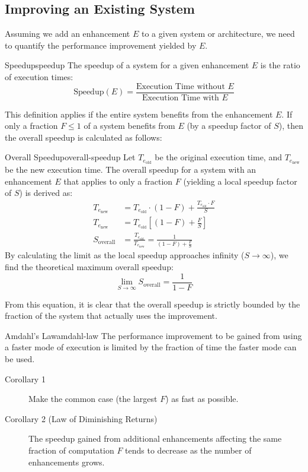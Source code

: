 \subsection{Improving an Existing System}

Assuming we add an enhancement \(E\) to a given system or architecture, we need to quantify the performance improvement yielded by \(E\).
\begin{definition}{Speedup}{speedup}
    The speedup of a system for a given enhancement \(E\) is the ratio of execution times:
    \[
        \text{Speedup}(E) = \frac{\text{Execution Time without } E}{\text{Execution Time with } E}
    \]
\end{definition}
This definition applies if the entire system benefits from the enhancement \(E\). If only a fraction \(F \leq 1\) of a system benefits from \(E\) (by a speedup factor of \(S\)), then the overall speedup is calculated as follows:

\begin{definition}{Overall Speedup}{overall-speedup}
    Let \(T_{e_{\text{old}}}\) be the original execution time, and \(T_{e_{\text{new}}}\) be the new execution time. The overall speedup for a system with an enhancement \(E\) that applies to only a fraction \(F\) (yielding a local speedup factor of \(S\)) is derived as:
    \begin{align*}
        T_{e_{\text{new}}} &= T_{e_{\text{old}}} \cdot (1 - F) + \frac{T_{e_{\text{old}}} \cdot F}{S} \\
        T_{e_{\text{new}}} &= T_{e_{\text{old}}} \left[ (1 - F) + \frac{F}{S} \right] \\
        S_{\text{overall}} &= \frac{T_{e_{\text{old}}}}{T_{e_{\text{new}}}} = \frac{1}{(1 - F) + \frac{F}{S}}
    \end{align*}
    By calculating the limit as the local speedup approaches infinity (\(S \to \infty\)), we find the theoretical maximum overall speedup:
    \[
        \lim_{S \to \infty} S_{\text{overall}} = \frac{1}{1-F}
    \]
\end{definition}
From this equation, it is clear that the overall speedup is strictly bounded by the fraction of the system that actually uses the improvement.

\begin{theorem}{Amdahl's Law}{amdahl-law}
    The performance improvement to be gained from using a faster mode of execution is limited by the fraction of time the faster mode can be used.
    \begin{description}
        \item[Corollary 1] Make the common case (the largest \(F\)) as fast as possible.
        \item[Corollary 2 (Law of Diminishing Returns)] The speedup gained from additional enhancements affecting the same fraction of computation \(F\) tends to decrease as the number of enhancements grows.
    \end{description}
\end{theorem}
